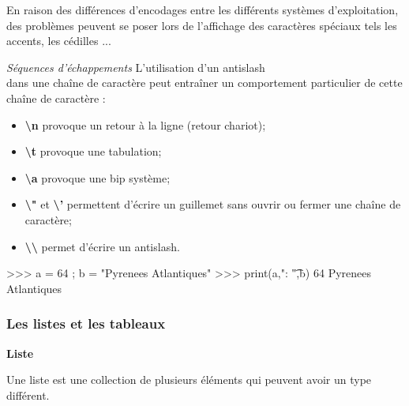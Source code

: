 \documentclass[11pt,oneside]{article}
\begin{document}
\begin{rem}
En raison des différences d'encodages entre les différents systèmes d'exploitation, des problèmes peuvent se poser lors de l'affichage des caractères spéciaux tels les accents, les cédilles ...
\end{rem}

\begin{rem}
\textit{Séquences d'échappements}
L'utilisation d'un antislash \\ dans une chaîne de caractère peut entraîner un comportement particulier de cette chaîne de caractère : 
\begin{itemize}
\item \textbf{\textbackslash n} provoque un retour à la ligne (retour chariot);
\item \textbf{\textbackslash t}  provoque une tabulation;
\item \textbf{\textbackslash a} provoque une bip système;
\item \textbf{\textbackslash "} et \textbf{\textbackslash '} permettent d'écrire un guillemet sans ouvrir ou fermer une chaîne de caractère;
\item \textbf{\textbackslash\textbackslash} permet d'écrire un antislash.
\end{itemize}
\end{rem}

\begin{exemple}
\begin{minipage}[c]{.45\linewidth}
\begin{py}
\begin{python}
>>> a = 64 ; b = "Pyrenees Atlantiques"
>>> print(a,": \t",b)
	64 	 Pyrenees Atlantiques
\end{python}
\end{py}
\end{minipage}\hfill
\begin{minipage}[c]{.45\linewidth}
\end{minipage}
\end{exemple}

\subsubsection{Les listes et les tableaux}

\begin{defi}
\textbf{Liste}

Une liste est une collection de plusieurs éléments qui peuvent avoir un type différent. 
\end{defi}
\end{document}
